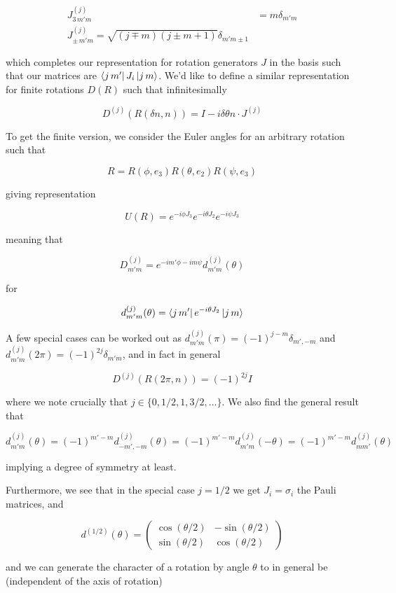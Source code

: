 \documentclass{article}
\theoremstyle{definition}
\begin{document}
\begin{align*}
J^{(j)}_{3 \, m'm} &= m \delta_{m'm} \\
J^{(j)}_{\pm \, m'm} = \sqrt{(j \mp m)(j \pm m + 1)} \delta_{m'm \pm 1}
\end{align*}

which completes our representation for rotation generators $J$ in the basis such
that our matrices are $\bra{j \, m'} J_i \ket{j \, m}$. We'd like to define a
similar representation for finite rotations $D(R)$ such that infinitesimally

$$ D^{(j)}(R(\delta n, n)) = I - i \delta \theta n \cdot J^{(j)} $$

To get the finite version, we consider the Euler angles for an arbitrary
rotation such that

$$ R = R(\phi, e_3) R(\theta, e_2) R(\psi, e_3) $$

giving representation

$$ U(R) = e^{-i \phi J_3} e^{-i\theta J_2} e^{-i\psi J_3} $$

meaning that

$$ D^{(j)}_{m'm} = e^{-i m' \phi - i m \psi} d^{(j)}_{m'm}(\theta) $$

for

$$ d^{(j)}_{m'm}(\theta) = \bra{j \, m'} e^{-i \theta J_2} \ket{j \, m} $$

A few special cases can be worked out as $d^{(j)}_{m'm}(\pi) = (-1)^{j - m}
\delta_{m', -m}$ and $d^{(j)}_{m'm} (2\pi) = (-1)^{2j} \delta_{m'm}$, and in
fact in general

$$ D^{(j)}(R(2\pi, n)) = (-1)^{2j} I $$

where we note crucially that $j \in \{0, 1/2, 1, 3/2, \dots\}$. We also find the
general result that

$$ d^{(j)}_{m'm} (\theta) = (-1)^{m' - m} d^{(j)}_{-m', -m}(\theta) = (-1)^{m' -
  m} d^{(j)}_{m'm} (-\theta) = (-1)^{m' - m} d^{(j)}_{mm'}(\theta) $$

implying a degree of symmetry at least.

Furthermore, we see that in the special case $j=1/2$ we get $J_i = \sigma_i$ the
Pauli matrices, and

$$ d^{(1/2)}(\theta) =
\begin{pmatrix}
  \cos(\theta / 2) & -\sin(\theta / 2) \\
  \sin(\theta / 2) & \cos(\theta / 2)
\end{pmatrix}
$$

and we can generate the character of a rotation by angle $\theta$ to in general
be (independent of the axis of rotation)
\end{document}
